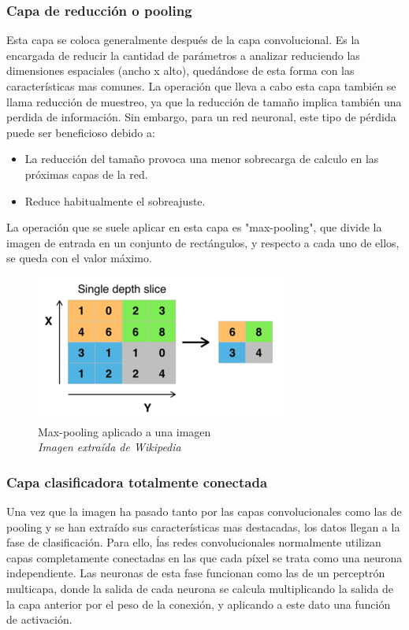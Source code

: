 \subsubsection{Capa de reducción o pooling}
Esta capa se coloca generalmente después de la capa convolucional. Es la encargada de reducir la cantidad de parámetros a analizar reduciendo las dimensiones espaciales (ancho x alto), quedándose de esta forma con las características mas comunes. La operación que lleva a cabo esta capa también se llama reducción de muestreo, ya que la reducción de tamaño implica también una perdida de información. Sin embargo, para un red neuronal, este tipo de pérdida puede ser beneficioso debido a:
\begin{itemize}
\item La reducción del tamaño provoca una menor sobrecarga de calculo en las próximas capas de la red.
\item Reduce habitualmente el sobreajuste.
\end{itemize}
La operación que se suele aplicar en esta capa es "max-pooling", que divide la imagen de entrada en un conjunto de rectángulos, y respecto a cada uno de ellos, se queda con el valor máximo.
\begin{figure}[htp]
\centering
\includegraphics[scale=0.7]{images/max_pooling.png}
\caption{Max-pooling aplicado a una imagen\\\textit{Imagen extraída de Wikipedia}}
\end{figure}
\subsubsection{Capa clasificadora totalmente conectada}
Una vez que la imagen ha pasado tanto por las capas convolucionales como las de pooling y se han extraído sus características mas destacadas, los datos llegan a la fase de clasificación. Para ello, ĺas redes convolucionales normalmente utilizan capas completamente conectadas en las que cada píxel se trata como una neurona independiente. Las neuronas de esta fase funcionan como las de un perceptrón multicapa, donde la salida de cada neurona se calcula multiplicando la salida de la capa anterior por el peso de la conexión, y aplicando a este dato una función de activación.

